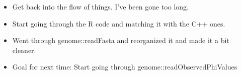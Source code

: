 \documentclass[letterpaper,index=totoc,hyperref,openany]{labbook} %
\begin{document}

\begin{itemize}
	\item Get back into the flow of things. I've been gone too long.
	\item Start going through the R code and matching it with the C++ ones.
\end{itemize}

\begin{itemize}
	\item Went through genome::readFasta and reorganized it and made it a bit cleaner.
	\item Goal for next time: Start going through genome::readObservedPhiValues
	

\end{itemize}

\printbibliography
\end{document}

